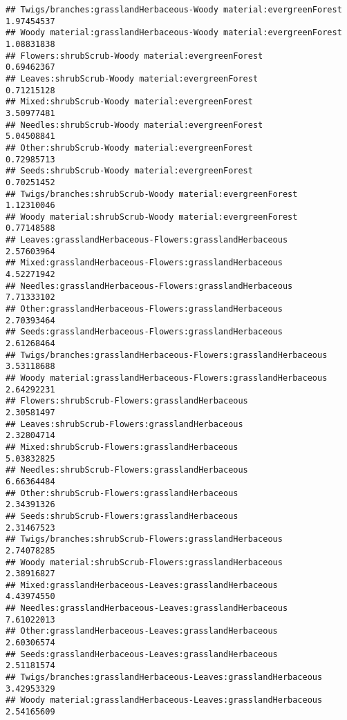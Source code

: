 \documentclass[
]{article}
\begin{document}
\begin{verbatim}
## Twigs/branches:grasslandHerbaceous-Woody material:evergreenForest      1.97454537
## Woody material:grasslandHerbaceous-Woody material:evergreenForest      1.08831838
## Flowers:shrubScrub-Woody material:evergreenForest                      0.69462367
## Leaves:shrubScrub-Woody material:evergreenForest                       0.71215128
## Mixed:shrubScrub-Woody material:evergreenForest                        3.50977481
## Needles:shrubScrub-Woody material:evergreenForest                      5.04508841
## Other:shrubScrub-Woody material:evergreenForest                        0.72985713
## Seeds:shrubScrub-Woody material:evergreenForest                        0.70251452
## Twigs/branches:shrubScrub-Woody material:evergreenForest               1.12310046
## Woody material:shrubScrub-Woody material:evergreenForest               0.77148588
## Leaves:grasslandHerbaceous-Flowers:grasslandHerbaceous                 2.57603964
## Mixed:grasslandHerbaceous-Flowers:grasslandHerbaceous                  4.52271942
## Needles:grasslandHerbaceous-Flowers:grasslandHerbaceous                7.71333102
## Other:grasslandHerbaceous-Flowers:grasslandHerbaceous                  2.70393464
## Seeds:grasslandHerbaceous-Flowers:grasslandHerbaceous                  2.61268464
## Twigs/branches:grasslandHerbaceous-Flowers:grasslandHerbaceous         3.53118688
## Woody material:grasslandHerbaceous-Flowers:grasslandHerbaceous         2.64292231
## Flowers:shrubScrub-Flowers:grasslandHerbaceous                         2.30581497
## Leaves:shrubScrub-Flowers:grasslandHerbaceous                          2.32804714
## Mixed:shrubScrub-Flowers:grasslandHerbaceous                           5.03832825
## Needles:shrubScrub-Flowers:grasslandHerbaceous                         6.66364484
## Other:shrubScrub-Flowers:grasslandHerbaceous                           2.34391326
## Seeds:shrubScrub-Flowers:grasslandHerbaceous                           2.31467523
## Twigs/branches:shrubScrub-Flowers:grasslandHerbaceous                  2.74078285
## Woody material:shrubScrub-Flowers:grasslandHerbaceous                  2.38916827
## Mixed:grasslandHerbaceous-Leaves:grasslandHerbaceous                   4.43974550
## Needles:grasslandHerbaceous-Leaves:grasslandHerbaceous                 7.61022013
## Other:grasslandHerbaceous-Leaves:grasslandHerbaceous                   2.60306574
## Seeds:grasslandHerbaceous-Leaves:grasslandHerbaceous                   2.51181574
## Twigs/branches:grasslandHerbaceous-Leaves:grasslandHerbaceous          3.42953329
## Woody material:grasslandHerbaceous-Leaves:grasslandHerbaceous          2.54165609

\end{verbatim}
\end{document}
